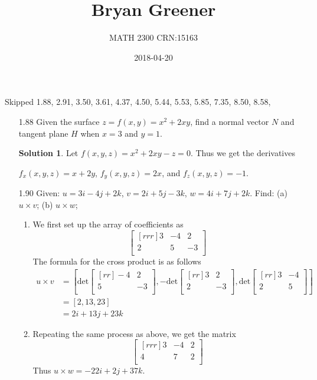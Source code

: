 \documentclass[12pt]{article}
\title{Bryan Greener}
\author{MATH 2300 CRN:15163}
\date{2018-04-20}
\theoremstyle{plain}
\theoremstyle{definition}
\newtheorem*{solution}{Solution} %
\theoremstyle{plain}
\begin{document}
\maketitle

\TabPositions{4cm}
Skipped 1.88, 2.91, 3.50, 3.61, 4.37, 4.50, 5.44, 5.53, 5.85, 7.35, 8.50, 8.58, 



\begin{enumerate}
\item[1.88]Given the surface $z=f(x,y)=x^2+2xy$, find a normal vector $N$ and tangent plane $H$ when $x=3$ and $y=1$.
	\begin{solution}
	Let $f(x,y,z) = x^2+2xy-z = 0$. Thus we get the derivatives 
	\begin{center}
	$f_x(x,y,z)=x+2y$, $f_y(x,y,z)=2x$, and $f_z(x,y,z)=-1$.
	\end{center}
	\end{solution}
	
\item[1.90]Given: $u=3i-4j+2k$, $v=2i+5j-3k$, $w=4i+7j+2k$. Find: (a) $u \times v$; (b) $u \times w$;
	\begin{enumerate}
	\item We first set up the array of coefficients as
		\[ \begin{bmatrix}[rrr]3&-4&2\\2&5&-3\\\end{bmatrix} \]
		The formula for the cross product is as follows
		\begin{align*}
		u \times v &= \left[ \mathrm{det}\begin{bmatrix}[rr]-4&2\\5&-3\\\end{bmatrix},-\mathrm{det}\begin{bmatrix}[rr]3&2\\2&-3\\\end{bmatrix},\mathrm{det}\begin{bmatrix}[rr]3&-4\\2&5\\\end{bmatrix}\right]\\
		&= [ 2, 13, 23 ]\\
		&= 2i+13j+23k 
		\end{align*}
	\item Repeating the same process as above, we get the matrix
		\[ \begin{bmatrix}[rrr]3&-4&2\\4&7&2\\\end{bmatrix} \]
		Thus $u\times w =-22i+2j+37k$. 
	\end{enumerate}
	

\end{enumerate}
\end{document}
